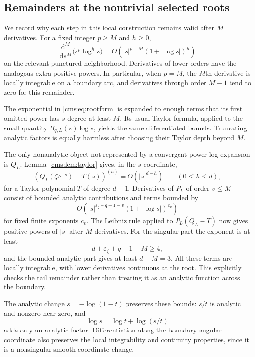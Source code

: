 \subsection{Remainders at the nontrivial selected roots}
We record why each step in this local construction remains valid after $M$ derivatives. For a fixed integer $p\geq M$ and $h\geq0$,
\begin{equation}\label{cms:eq:monomialderivatives}
\frac{\mathrm d^M}{\mathrm ds^M}\bigl(s^p\log^h s\bigr)
=O\!\left(|s|^{p-M}(1+|\log s|)^h\right)
\end{equation}
on the relevant punctured neighborhood. Derivatives of lower orders have the analogous extra positive powers. In particular, when $p=M$, the $M$th derivative is locally integrable on a boundary arc, and derivatives through order $M-1$ tend to zero for this remainder.

The exponential in \eqref{cms:eq:rootform} is expanded to enough terms that its first omitted power has $s$-degree at least $M$. Its usual Taylor formula, applied to the small quantity $B_{q,L}(s)\log s$, yields the same differentiated bounds. Truncating analytic factors is equally harmless after choosing their Taylor depth beyond $M$.

The only nonanalytic object not represented by a convergent power-log expansion is $Q_L$. Lemma~\ref{cms:lem:taylor} gives, in the $s$ coordinate,
\begin{equation}\label{cms:eq:Qremainder}
\left(Q_L(\zeta\ee^{-s})-T(s)\right)^{(h)}
=O(|s|^{d-h})\qquad(0\leq h\leq d),
\end{equation}
for a Taylor polynomial $T$ of degree $d-1$. Derivatives of $P_L$ of order $v\leq M$ consist of bounded analytic contributions and terms bounded by
\[
O\!\left(|s|^{\varepsilon_\zeta+q-1-v}
 (1+|\log s|)^{c_v}\right)
\]
for fixed finite exponents $c_v$. The Leibniz rule applied to $P_L(Q_L-T)$ now gives positive powers of $|s|$ after $M$ derivatives. For the singular part the exponent is at least
\[
d+\varepsilon_\zeta+q-1-M\geq4,
\]
and the bounded analytic part gives at least $d-M=3$. All these terms are locally integrable, with lower derivatives continuous at the root. This explicitly checks the tail remainder rather than treating it as an analytic function across the boundary.

The analytic change $s=-\log(1-t)$ preserves these bounds: $s/t$ is analytic and nonzero near zero, and
\[
\log s=\log t+\log(s/t)
\]
adds only an analytic factor. Differentiation along the boundary angular coordinate also preserves the local integrability and continuity properties, since it is a nonsingular smooth coordinate change.

